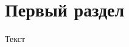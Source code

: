\documentclass[a4paper, 12pt]{article}
\begin{document}

\pagebreak
\tableofcontents
\newpage
\section{Первый раздел}
Текст
\end{document}
